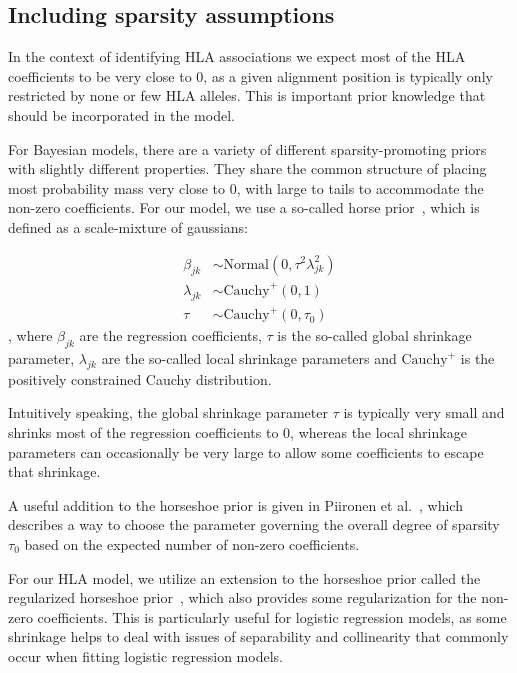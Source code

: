 \documentclass[fleqn,11pt]{SelfArx} %
\begin{document}
\subsection*{Including sparsity assumptions} \label{sec:sparsity}

In the context of identifying HLA associations we expect most of the HLA coefficients to be very close to 0, as a given alignment position is typically only restricted by none or few HLA alleles.
This is important prior knowledge that should be incorporated in the model.

For Bayesian models, there are a variety of different sparsity-promoting priors with slightly different properties. They share the common structure of placing most probability mass very close to 0, with large to tails to accommodate the non-zero coefficients.
For our model, we use a so-called horse prior~\cite{Carvalho2010}, which is defined as a scale-mixture of gaussians:

\begin{equation}
  \begin{aligned}
    \beta_{jk} &\sim \text{Normal}(0, \tau^{2}\lambda^{2}_{jk}) \\
    \lambda_{jk} &\sim \text{Cauchy}^{+}(0, 1) \\
    \tau &\sim \text{Cauchy}^{+}(0, \tau_{0})
  \end{aligned}
\end{equation},
where \(\beta_{jk}\) are the regression coefficients, \(\tau\) is the so-called global shrinkage parameter, \(\lambda_{jk}\) are the so-called local shrinkage parameters and \(\text{Cauchy}^{+}\) is the positively constrained Cauchy distribution.

Intuitively speaking, the global shrinkage parameter \(\tau\) is typically very small and shrinks most of the regression coefficients to 0, whereas the local shrinkage parameters can occasionally be very large to allow some coefficients to escape that shrinkage.

A useful addition to the horseshoe prior is given in Piironen et al.~\cite{Piironen2017}, which describes a way to choose the parameter governing the overall degree of sparsity \(\tau_{0}\) based on the expected number of non-zero coefficients. 

For our HLA model, we utilize an extension to the horseshoe prior called the regularized horseshoe prior~\cite{Piironen2017}, which also provides some regularization for the non-zero coefficients. This is particularly useful for logistic regression models, as some shrinkage helps to deal with issues of separability and collinearity that commonly occur when fitting logistic regression models.
\end{document}
